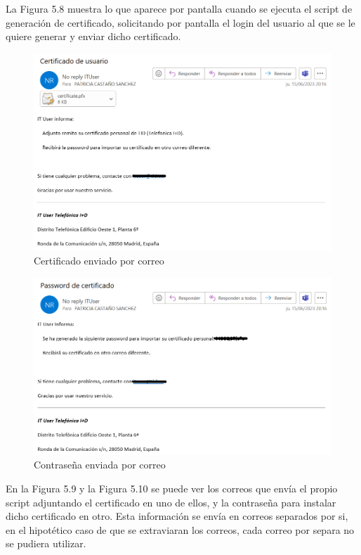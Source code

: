 \documentclass[a4paper, 12pt]{book}
\begin{document}
\begin{itemize}
La Figura 5.8 muestra lo que aparece por pantalla cuando se ejecuta el script de generación de certificado, solicitando por pantalla el login del usuario al que se le quiere generar y enviar dicho certificado.

\begin{figure}[H]
	\centering
	\includegraphics[width=17cm, keepaspectratio]{img/image09.png}
	\caption{Certificado enviado por correo}
	\label{fig:image09}
\end{figure}

\begin{figure}[H]
	\centering
	\includegraphics[width=17cm, keepaspectratio]{img/image10.png}
	\caption{Contraseña enviada por correo}
	\label{fig:image10}
\end{figure}

En la Figura 5.9 y la Figura 5.10 se puede ver los correos que envía el propio script adjuntando el certificado en uno de ellos, y la contraseña para instalar dicho certificado en otro. Esta información se envía en correos separados por si, en el hipotético caso de que se extraviaran los correos, cada correo por separa no se pudiera utilizar.


\end{itemize}
\end{document}
